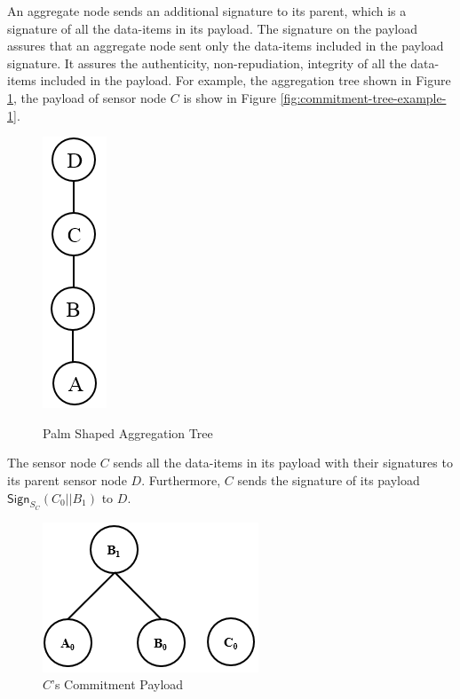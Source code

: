 	An aggregate node sends an additional signature to its parent, which is a signature of all the data-items in its payload.
	The signature on the payload assures that an aggregate node sent only the data-items included in the payload signature.
	It assures the authenticity, non-repudiation, integrity of all the data-items included in the payload.
	For example, the aggregation tree shown in Figure \ref{fig:Palm aggregation tree}, the payload of sensor node $C$ is show in Figure \ref{fig:commitment-tree-example-1}.
			\begin{figure}[h!]
				\centering
				\includegraphics[scale = 1]{images/palm-aggregation-tree.png}\\
				\caption{Palm Shaped Aggregation Tree}
				\label{fig:Palm aggregation tree}
			\end{figure}
		The sensor node $C$ sends all the data-items in its payload with their signatures to its parent sensor node $D$.
		Furthermore, $C$ sends the signature of its payload $\textsf{Sign}_{S_{C}}(C_{0}||B_{1})$ to $D$.\\
			\begin{figure}[h!]
				\centering
				\includegraphics[scale = 1]{images/commitment-payload-of-C.png}
				\caption{$C$'s Commitment Payload}
				\label{fig:Commitment payload of C}
			\end{figure}
